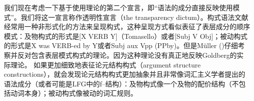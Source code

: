     我们现在考虑一下基于使用理论的第二个宣言，即“语法的成分直接反映使用模式”。我们将这一宣言称作透明性宣言（the transparency dictum）。构式语法文献经常用一种非形式化的方法来呈现构式，这种呈现方式看似表征了表层成分的顺序模式：及物构式的形式是[X VERB Y]（Tomasello）或者[Subj V Obj]\citep{Goldberg95a,Goldberg2006a}；被动构式的形式是X was VERB-ed by Y\citep[]{Tomasello2003a}或者Subj aux Vpp (PPby)\citep[]{Goldberg2006a}。但是Müller (\citeyear[\S~2]{Mueller2006d})仔细考察并反对包含表层模式构式的理论。因为这种理论没有真正地反映Goldberg的实际理论。 如果更加细致地表征论元结构构式（argument structure constructions），就会发现论元结构构式更加抽象并且非常像词汇主义学者提出的语法成分（或者可能是LFG中的f--结构）：及物构式像一个及物的配价结构（不包括动词本身）；被动构式像被动的词汇规则。

